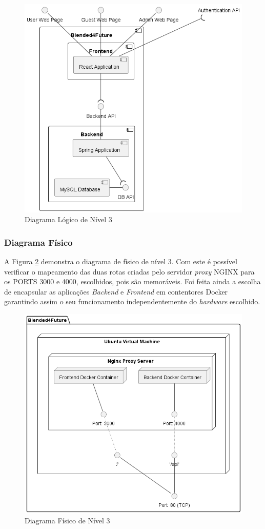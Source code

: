 \begin{figure}[h!tbp]
    \centering
    \includegraphics[width=0.8\linewidth]{capitulos/cap3-analisedoproblema/assets/arquiteturasistema/logical/logical_l3.png}
    \caption{Diagrama Lógico de Nível 3}
    \label{fig:diagram-lvl3-logical}
\end{figure}

\subsubsection{Diagrama Físico} 
A Figura \ref{fig:diagram-lvl3-physical} demonstra o diagrama de físico de nível 3. Com este é possível verificar o mapeamento das duas rotas criadas pelo servidor \textit{proxy} \gls{NGINX} para os PORTS 3000 e 4000, escolhidos, pois são memoráveis. Foi feita ainda a escolha de encapsular as aplicações \textit{Backend} e \textit{Frontend} em contentores \gls{Docker} garantindo assim o seu funcionamento independentemente do \textit{hardware} escolhido.

\begin{figure}[h!tbp]
    \centering
    \includegraphics[width=0.7\linewidth]{capitulos/cap3-analisedoproblema/assets/arquiteturasistema/physical/physical_l3.png}
    \caption{Diagrama Físico de Nível 3}
    \label{fig:diagram-lvl3-physical}
\end{figure}





